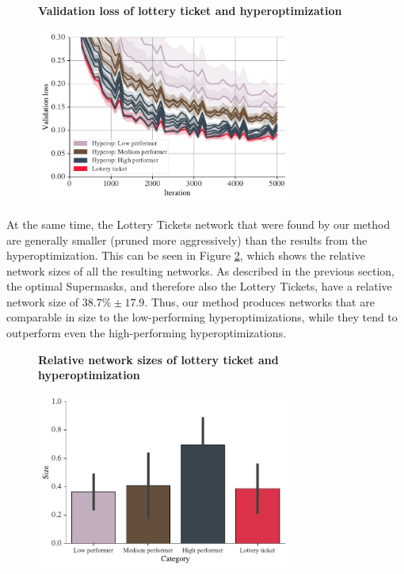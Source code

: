 \documentclass[12pt,final,twoside]{article}
\theoremstyle{plain}
\theoremstyle{definition}
\theoremstyle{remark}
\theoremstyle{named}
\begin{document}
\begin{figure}[h]
  \centering
  \textbf{Validation loss of lottery ticket and hyperoptimization}\par\medskip
  \includegraphics[width=0.75\textwidth]{plots/lt-accuracy.pdf}
  \caption{}
  \label{fig:lt-accuracy}
\end{figure}

At the same time, the Lottery Tickets network that were found by our method are generally smaller (pruned more aggressively) than the results from the hyperoptimization. This can be seen in Figure \ref{fig:lt-size}, which shows the relative network sizes of all the resulting networks. As described in the previous section, the optimal Supermasks, and therefore also the Lottery Tickets, have a relative network size of $38.7\% \pm 17.9$. Thus, our method produces networks that are comparable in size to the low-performing hyperoptimizations, while they tend to outperform even the high-performing hyperoptimizations.

\begin{figure}[h]
  \centering
  \textbf{Relative network sizes of lottery ticket and hyperoptimization}\par\medskip
  \includegraphics[width=0.75\textwidth]{plots/lt-size.pdf}
  \caption{}
  \label{fig:lt-size}
\end{figure}
\end{document}
